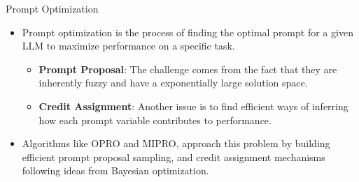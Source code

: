 \documentclass{beamer}
\begin{document}
\begin{frame}{Prompt Optimization}
    \begin{itemize}
        \item Prompt optimization is the process of finding the optimal prompt for a given LLM to maximize performance on a specific task.
        \vspace{0.5em}
        \begin{itemize}
            \item \textbf{Prompt Proposal}: The challenge comes from the fact that they are inherently fuzzy and have a exponentially large solution space.
            \vspace{0.5em}
            \item \textbf{Credit Assignment}: Another issue is to find efficient ways of inferring how each prompt variable contributes to performance.
        \end{itemize}
        \item Algorithms like OPRO and MIPRO, approach this problem by building efficient prompt proposal sampling, and credit assignment mechanisms following ideas from Bayesian optimization.
    \end{itemize}
\end{frame}
\end{document}
